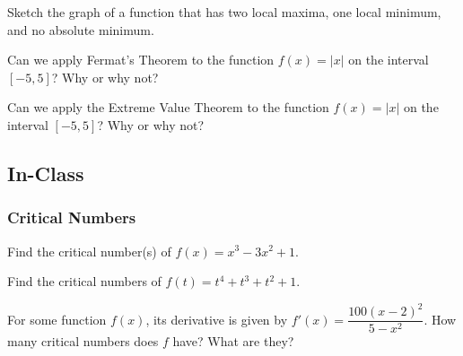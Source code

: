 \documentclass[notes]{subfiles}
\begin{document}
		\begin{ex}
			Sketch the graph of a function that has two local maxima, one local minimum, and no absolute minimum.
		\end{ex}
		\begin{ex}
			Can we apply Fermat's Theorem to the function $f(x) = |x|$ on the interval $[-5,5]$?  Why or why not? 
		\end{ex}
			
		\begin{ex}
			Can we apply the Extreme Value Theorem to the function $f(x) = |x|$ on the interval $[-5,5]$?  Why or why not?
		\end{ex}
			\newpage
	
	\subsection*{In-Class}
	\subsubsection*{Critical Numbers}	
		\begin{defn}
		\end{defn}
		\begin{ex}
			Find the critical number(s) of $f(x) = x^3 -3x^2 + 1$.
		\end{ex}
			
		\begin{ex}
			Find the critical numbers of $f(t) = t^4 + t^3+t^2 + 1$.
		\end{ex}
			\newpage
		\begin{ex}
			For some function $f(x)$, its derivative is given by $f'(x) = \dfrac{100(x-2)^2}{5-x^2}$.  How many critical numbers does $f$ have?  What are they?
		\end{ex}	
			
\end{document}
